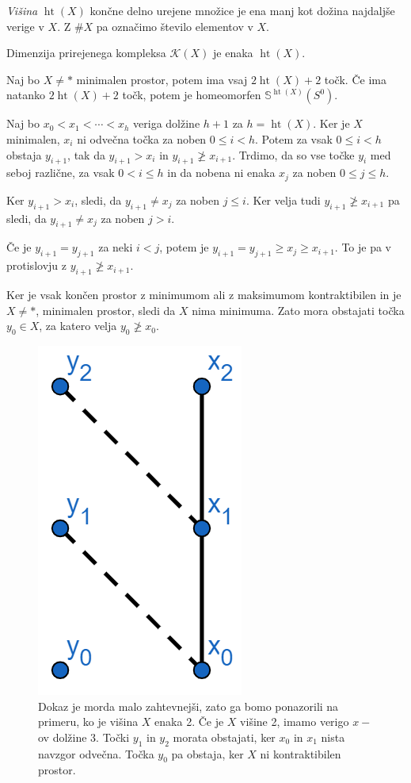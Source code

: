 \documentclass[mat1]{fmfdelo}
\DeclareMathOperator*{\htt}{ht}
\newcommand{\Sus}{\mathbb S}
\begin{document}
  \begin{definicija}
      \emph{Višina} $\htt(X)$ končne delno urejene množice je ena manj kot dožina najdaljše verige v $X$. Z $\# X$ pa označimo število elementov v $X$.
  \end{definicija}
  Dimenzija prirejenega kompleksa $\mathcal{K}(X)$ je enaka $\htt(X)$.
  
  
  \begin{izrek}
      Naj bo $X\neq\ast$ minimalen prostor, potem ima vsaj $2\htt(X)+2$ točk. Če ima natanko $2\htt(X)+2$ točk, potem je homeomorfen $\Sus^{\htt(X)}(S^0)$.
  \end{izrek}    
  
  \begin{dokaz}
      Naj bo $x_0<x_1 <\cdots <x_h$ veriga dolžine $h+1$ za $h=\htt(X)$. Ker je $X$
       minimalen, $x_i$ ni odvečna točka za noben $0\leq i <h$. Potem za 
       vsak $0\leq i <h$ obstaja $y_{i+1}$, tak da $y_{i+1}> x_i$ in $y_{i+1}
       \ngeq x_{i+1}$. Trdimo, da so vse točke $y_i$ med seboj različne, za vsak
        $0< i \leq h$ in da nobena ni enaka $x_j$ za noben $0\leq j \leq h$.
  


        Ker $y_{i+1} > x_i$, sledi, da $y_{i+1}\neq x_j$ za noben $j\leq i$. Ker velja tudi $y_{i+1}\ngeq x_{i+1}$ pa sledi, da $y_{i+1}\neq x_j$ za 
        noben $j> i$.
  
        Če je $y_{i+1}= y_{j+1}$ za neki $i<j$, potem je $y_{i+1}= y_{j+1}\geq
         x_j \geq x_{i+1}$. To je pa v protislovju z $y_{i+1} 
         \ngeq x_{i+1}$.
  
         Ker je vsak končen prostor z minimumom ali z maksimumom kontraktibilen 
         in je $X\neq \ast$, minimalen prostor, sledi da $X$ nima minimuma. Zato mora obstajati točka $y_0\in X$, za katero velja $y_0 \ngeq x_0$.

         \begin{figure}[h!]
            \centering
            \includegraphics[width=0.2\linewidth]{minsfera-prva.png}
          \caption{Dokaz je morda malo zahtevnejši, zato ga bomo ponazorili na primeru, ko je višina $X$ enaka 2. Če je $X$ višine 2, imamo verigo $x-$ov dolžine 3. Točki $y_1$ in $y_2$ morata obstajati, ker $x_0$ in $x_1$ nista navzgor odvečna. Točka $y_0$ pa obstaja, ker $X$ ni kontraktibilen prostor.}
          \end{figure}



\end{dokaz}
\end{document}
